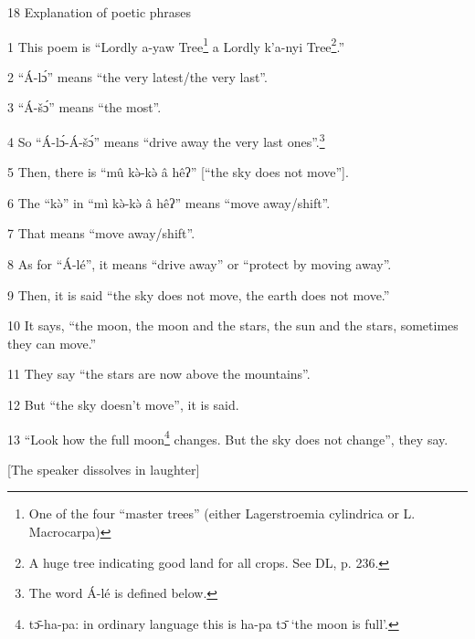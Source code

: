 
18 Explanation of poetic phrases

1 This poem is ``Lordly a-yaw Tree\footnote{One of the four ``master trees'' (either Lagerstroemia cylindrica or L. Macrocarpa)} a Lordly k'a-nyi Tree\footnote{A huge tree indicating good land for all crops. See DL, p. 236.}.''

2 ``Á-lɔ́'' means ``the very latest/the very last''.

3 ``Á-šɔ́'' means ``the most''.

4 So ``Á-lɔ́-Á-šɔ́'' means ``drive away the very last ones''.\footnote{The word Á-lé is defined below.}

5 Then, there is ``mû kə̀-kə̀ â hêʔ'' [``the sky does not move''].

6 The ``kə̀'' in ``mì kə̀-kə̀ â hêʔ'' means ``move away/shift''.

7 That means ``move away/shift''.

8 As for ``Á-lé'', it means ``drive away'' or ``protect by moving away''.

9 Then, it is said ``the sky does not move, the earth does not move.''

10 It says, ``the moon, the moon and the stars, the sun and the stars, sometimes
they can move.''

11 They say ``the stars are now above the mountains''.

12 But ``the sky doesn't move'', it is said.

13 ``Look how the full moon\footnote{tɔ̄-ha-pa: in ordinary language this is ha-pa tɔ̄ `the moon is full'.} changes. But the sky does not change'', they say.

[The speaker dissolves in laughter]


